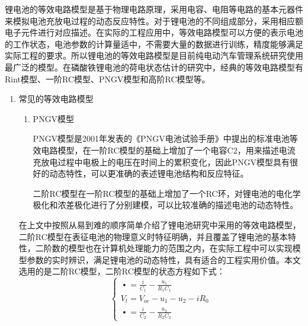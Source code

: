锂电池的等效电路模型是基于物理电路原理，采用电容、电阻等电路的基本元器件来模拟电池充放电过程的动态反应特性。对于锂电池的不同组成部分，采用相应额电子元件进行对应描述。在实际的工程应用中，等效电路模型可以方便的表示电池的工作状态，电池参数的计算量适中，不需要大量的数据进行训练，精度能够满足实际工程的要求。所以锂电池的等效电路模型是目前纯电动汽车管理系统研究使用最广泛的模型。在磷酸铁锂电池的荷电状态估计的研究中，经典的等效电路模型有Rint模型、一阶RC模型、PNGV模型和高阶RC模型等。
\begin{enumerate}
\item{常见的等效电路模型}
\begin{enumerate}

一阶RC模型由一个RC并联电路、一个恒定电阻R2和一个电压源Voc组成。在电路模型中R2代表的是锂电池的欧姆内阻，R1代表电池的极化内阻，电压源Voc代表电池的开路电压。一阶RC模型对锂电池的极化特性进行了描述，可以比较准确的描述锂电池的动态特性，结构也比较简单。
\item PNGV模型

PNGV模型是2001年发表的《PNGV电池试验手册》中提出的标准电池等效电路模型，在一阶RC模型的基础上增加了一个电容C2，用来描述电流充放电过程中电极上的电压在时间上的累积变化，因此PNGV模型具有很好的动态特性，可以更准确的表述锂电池结构和反应特征。

二阶RC模型在一阶RC模型的基础上增加了一个RC环，对锂电池的电化学极化和浓差极化进行了分别建模，可以比较准确的描述电池的动态特性。
\end{enumerate}
在上文中按照从易到难的顺序简单介绍了锂电池研究中采用的等效电路模型，二阶RC模型在表征电池的物理意义时特征明确，并且覆盖了锂电池的基本特性，二阶数的模型也在计算机处理能力的范围之内，在实际工程中可以实现模型参数的实时辨识，满足锂电池的动态特性，具有适合的工程实用价值。本文选用的是二阶RC模型，二阶RC模型的状态方程如下式：
\begin{equation}\label{2.4}
\left\{ \begin{array}{l}
\mathop {{u_1}}\limits^ \bullet   = \frac{i}{{{C_1}}} - \frac{{{u_1}}}{{{R_1}{C_1}}}\\
{V_t} = {V_{oc}} - {u_1} - {u_2} - i{R_0}\\
\mathop {{u_2}}\limits^ \bullet   = \frac{i}{{{C_2}}} - \frac{{{u_2}}}{{{R_2}{C_2}}}
\end{array} \right.
\end{equation}


\end{enumerate}
